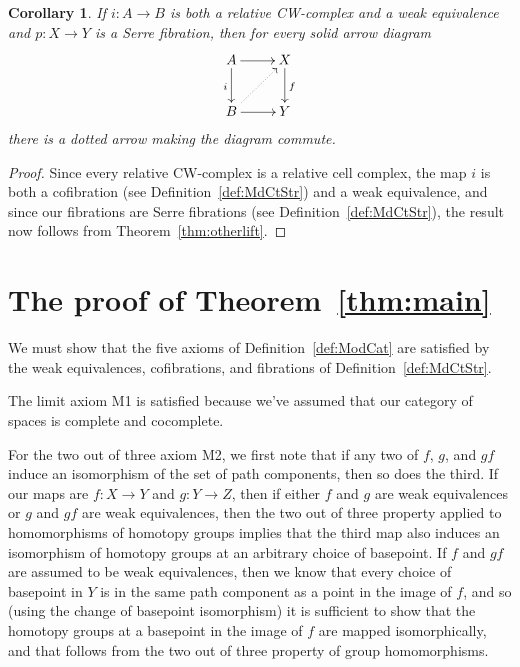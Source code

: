 \documentclass{amsart}
\numberwithin{equation}{section}
\theoremstyle{slplain}
\newtheorem{cor}[equation]{Corollary}
\theoremstyle{definition}
\theoremstyle{remark}
\newcommand{\thmref}{Theorem~\ref}
\newcommand{\defref}{Definition~\ref}
\begin{document}
\begin{cor}
  \label{cor:RelCWlift}
  If $i\colon A \to B$ is both a relative CW-complex and a weak
  equivalence and $p\colon X \to Y$ is a Serre fibration, then for
  every solid arrow diagram
  \begin{displaymath}
    \xymatrix{
      {A} \ar[r] \ar[d]_{i}
      & {X} \ar[d]^{f}\\
      {B} \ar[r] \ar@{..>}[ur]
      & {Y}
    }
  \end{displaymath}
  there is a dotted arrow making the diagram commute.
\end{cor}

\begin{proof}
  Since every relative CW-complex is a relative cell complex, the map
  $i$ is both a cofibration (see \defref{def:MdCtStr}) and a weak
  equivalence, and since our fibrations are Serre fibrations (see
  \defref{def:MdCtStr}), the result now follows from
  \thmref{thm:otherlift}.
\end{proof}

\section{The proof of \thmref{thm:main}}
\label{sec:proofmain}

We must show that the five axioms of \defref{def:ModCat} are satisfied
by the weak equivalences, cofibrations, and fibrations of
\defref{def:MdCtStr}.

The limit axiom M1 is satisfied because we've assumed that our
category of spaces is complete and cocomplete.

For the two out of three axiom M2, we first note that if any two of
$f$, $g$, and $gf$ induce an isomorphism of the set of path
components, then so does the third.  If our maps are $f\colon X \to Y$
and $g\colon Y \to Z$, then if either $f$ and $g$ are weak
equivalences or $g$ and $gf$ are weak equivalences, then the two out
of three property applied to homomorphisms of homotopy groups implies
that the third map also induces an isomorphism of homotopy groups at
an arbitrary choice of basepoint.  If $f$ and $gf$ are assumed to be
weak equivalences, then we know that every choice of basepoint in $Y$
is in the same path component as a point in the image of $f$, and so
(using the change of basepoint isomorphism) it is sufficient to show
that the homotopy groups at a basepoint in the image of $f$ are mapped
isomorphically, and that follows from the two out of three property of
group homomorphisms.
\end{document}
